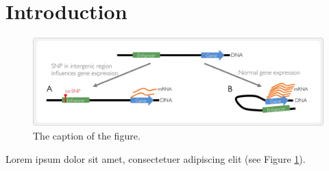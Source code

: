 \section*{Introduction}
\label{sec:introduction}

\begin{figure}[t]
\captionsetup{font=footnotesize}
  \centering
    \includegraphics[width=\textwidth]{./images/Fig1} %
  \caption{The caption of the figure. \label{fig:fig1}}
\end{figure}

\lipsum
Lorem ipsum dolor sit amet, consectetuer adipiscing elit (see Figure \ref{fig:fig1}).


